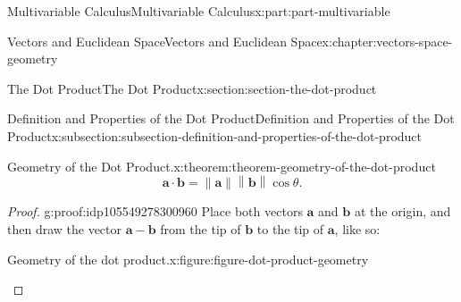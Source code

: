 \documentclass[twoside,10pt,]{book}
\numberwithin{equation}{part}
\newcommand{\norm}[1]{\left\| #1 \right\|}
\begin{document}
\begin{partptx}{Multivariable Calculus}{}{Multivariable Calculus}{}{}{x:part:part-multivariable}
\begin{chapterptx}{Vectors and Euclidean Space}{}{Vectors and Euclidean Space}{}{}{x:chapter:vectors-space-geometry}
\begin{sectionptx}{The Dot Product}{}{The Dot Product}{}{}{x:section:section-the-dot-product}
\begin{subsectionptx}{Definition and Properties of the Dot Product}{}{Definition and Properties of the Dot Product}{}{}{x:subsection:subsection-definition-and-properties-of-the-dot-product}
\begin{theorem}{Geometry of the Dot Product.}{}{x:theorem:theorem-geometry-of-the-dot-product}
%
\begin{equation*}
\mathbf{a}\cdot\mathbf{b} = \norm{\mathbf{a}}\norm{\mathbf{b}}\cos\theta.
\end{equation*}
\end{theorem}
\begin{proof}{}{g:proof:idp105549278300960}
Place both vectors \(\mathbf{a}\) and \(\mathbf{b}\) at the origin, and then draw the vector \(\mathbf{a}-\mathbf{b}\) from the tip of \(\mathbf{b}\) to the tip of \(\mathbf{a}\), like so:%
\begin{figureptx}{Geometry of the dot product.}{x:figure:figure-dot-product-geometry}{}%
\begin{image}{0.2}{0.6}{0.2}%
\end{image}
\end{figureptx}
\end{proof}
\end{subsectionptx}
\end{sectionptx}
\end{chapterptx}
\end{partptx}
\end{document}
